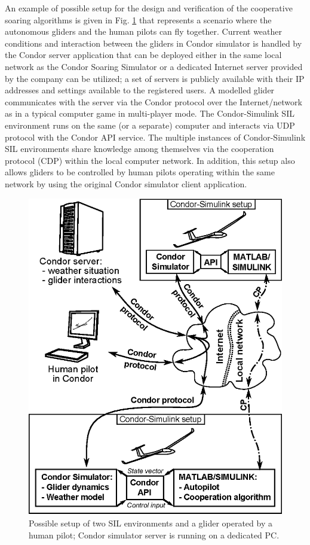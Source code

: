 \documentclass[letterpaper, 10 pt, conference]{ieeeconf}  %
\begin{document}
An example of possible setup for the design and verification of the cooperative soaring algorithms is given in Fig. \ref{fig:DevEnv} that represents a scenario where the autonomous gliders and the human pilots can fly together. Current weather conditions and interaction between the gliders in Condor simulator is handled by the Condor server application that can be deployed either in the same local network as the Condor Soaring Simulator or a dedicated Internet server provided by the company can be utilized; a set of servers is publicly available with their IP addresses and settings available to the registered users. A modelled glider communicates with the server via the Condor protocol over the Internet/network as in a typical computer game in multi-player mode. The Condor-Simulink SIL environment runs on the same (or a separate) computer and interacts via UDP protocol with the Condor API service. The multiple instances of Condor-Simulink SIL environments share knowledge among themselves via the cooperation protocol (CDP) within the local computer network. In addition, this setup also allows gliders to be controlled by human pilots operating within the same network by using the original Condor simulator client application.

\begin{figure}[thpb]
  \centering
  \includegraphics[scale=0.5]{Figures/dev_env_.eps}
  \caption{Possible setup of two SIL environments and a glider operated by a human pilot; Condor simulator server is running on a dedicated PC.}
  \label{fig:DevEnv}
\end{figure}
\end{document}
